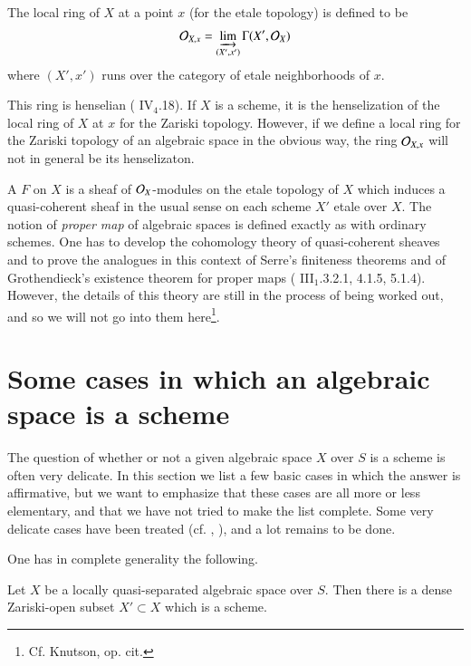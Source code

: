 \begin{definition}\label{art02-defi2.5}
The local ring of $X$ at a point $x$ (for the etale topology) is defined to be
$$
\mathcal{O}_{X,x}=\varinjlim\limits_{(X',x')}\Gamma (X',\mathcal{O}_{X})
$$
where $(X',x')$ runs over the category of etale neighborhoods of $x$.
\end{definition}

This ring is henselian (\cite{art02-key8} IV$_{4}$.18). If $X$ is a scheme, it is the henselization of the local ring of $X$ at $x$ for the Zariski topology. However, if we define a local ring for the Zariski topology of an algebraic space in the obvious way, the ring $\mathcal{O}_{X,x}$ will not in general be its henselizaton.

A $F$ on $X$ is a sheaf of $\mathcal{O}_{X}$-modules on the etale topology of $X$ which induces a quasi-coherent sheaf in the usual sense on each scheme $X'$ etale over $X$. The notion of {\em proper map} of algebraic spaces is defined exactly as with ordinary schemes. One has to develop the cohomology theory of quasi-coherent sheaves and to prove the analogues in this context of Serre's finiteness theorems and of Grothendieck's existence theorem for proper maps (\cite{art02-key8} III$_{1}$.3.2.1, 4.1.5, 5.1.4). However, the details of this theory are still in the process of being worked out, and so we will not go into them here\footnote{Cf. Knutson, op. cit.}.

\section{Some cases in which an algebraic space is a scheme}\label{art02-sec3}

The question of whether or not a given algebraic space $X$ over $S$ is a scheme is often very delicate. In this section we list a few basic cases in which the answer is affirmative, but we want to emphasize that these cases are all more or less elementary, and that we have not tried to make the list complete. Some very delicate cases have been treated (cf. \cite{art02-key25}, \cite{art02-key30}), and a lot remains to be done.

One has in complete generality the following.

\begin{theorem}\label{art02-thm3.1}
Let $X$ be a locally quasi-separated algebraic space over $S$. Then there is a dense Zariski-open subset $X'\subset X$ which is a scheme.
\end{theorem}

